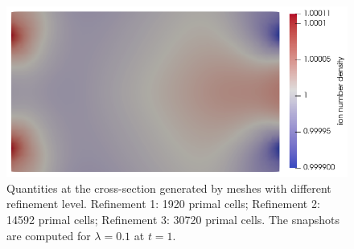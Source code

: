 \documentclass{report}
\begin{document}
\begin{figure}
    \includegraphics[scale=0.27]{clip_ni_T-1_lambda-1e-1_32-3-4.png}
    \caption{Quantities at the cross-section generated by meshes with different refinement level. Refinement 1: 1920 primal cells; Refinement 2: 14592 primal cells; Refinement 3: 30720 primal cells. The snapshots are computed for $\lambda = 0.1$ at $t = 1$.}
    \label{fig:grid_study_3d_clip_lambda-1e-1}
\end{figure}
\end{document}
